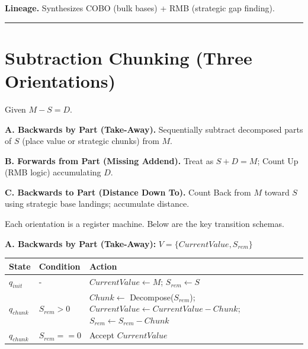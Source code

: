 \documentclass[12pt]{book}
\begin{document}
\textbf{Lineage.} Synthesizes COBO (bulk bases) + RMB (strategic gap
finding).

\begin{center}\rule{0.5\linewidth}{0.5pt}\end{center}

\section{Subtraction Chunking (Three
Orientations)}\label{subtraction-chunking-three-orientations}

Given \(M - S = D\).

\textbf{A. Backwards by Part (Take-Away).} Sequentially subtract
decomposed parts of \(S\) (place value or strategic chunks) from \(M\).

\textbf{B. Forwards from Part (Missing Addend).} Treat as \(S + D = M\);
Count Up (RMB logic) accumulating \(D\).

\textbf{C. Backwards to Part (Distance Down To).} Count Back from \(M\)
toward \(S\) using strategic base landings; accumulate distance.

Each orientation is a register machine. Below are the key transition
schemas.

\textbf{A. Backwards by Part (Take-Away):}
\(V = \{CurrentValue, S_{rem}\}\)

\begin{longtable}[]{@{}
  >{\raggedright\arraybackslash}p{}
  >{\raggedright\arraybackslash}p{}
  >{\raggedright\arraybackslash}p{}@{}}
\toprule\noalign{}
\begin{minipage}[b]{\linewidth}\raggedright
State
\end{minipage} & \begin{minipage}[b]{\linewidth}\raggedright
Condition
\end{minipage} & \begin{minipage}[b]{\linewidth}\raggedright
Action
\end{minipage} \\
\midrule\noalign{}
\endhead
\bottomrule\noalign{}
\endlastfoot
\(q_{init}\) & - & \(CurrentValue \leftarrow M\);
\(S_{rem} \leftarrow S\) \\
\(q_{chunk}\) & \(S_{rem} > 0\) & \(Chunk \leftarrow\)
Decompose(\(S_{rem}\));
\(CurrentValue \leftarrow CurrentValue - Chunk\);
\(S_{rem} \leftarrow S_{rem} - Chunk\) \\
\(q_{chunk}\) & \(S_{rem} == 0\) & Accept \(CurrentValue\) \\
\end{longtable}
\end{document}
